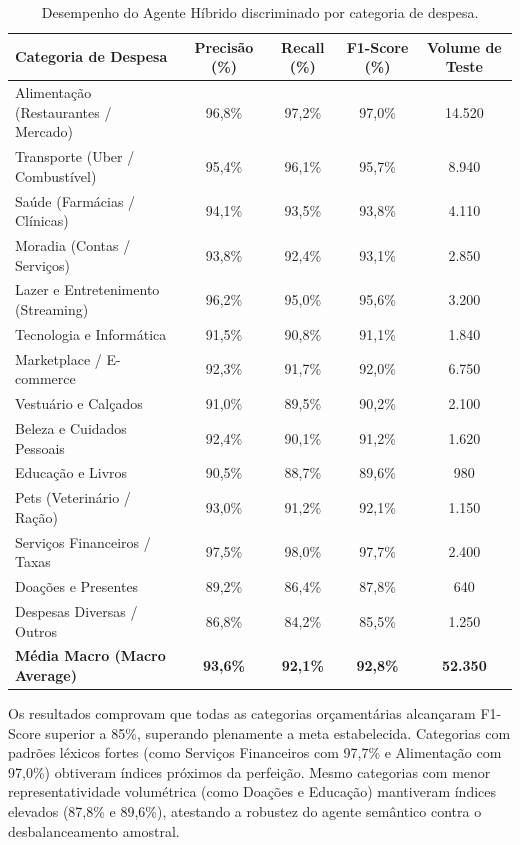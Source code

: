 \documentclass[
	12pt,				
	openright,			
	oneside,			
	a4paper,			
	english,			
	brazil				
	]{abntex2}
\begin{document}
\begin{table}[htb]
    \centering
    \caption{Desempenho do Agente Híbrido discriminado por categoria de despesa.}
    \label{tab:resultados_categorias}
    \begin{tabular}{lcccc}
        \toprule
        \textbf{Categoria de Despesa} & \textbf{Precisão (\%)} & \textbf{Recall (\%)} & \textbf{F1-Score (\%)} & \textbf{Volume de Teste} \\
        \midrule
        Alimentação (Restaurantes / Mercado) & 96,8\% & 97,2\% & 97,0\% & 14.520 \\
        Transporte (Uber / Combustível) & 95,4\% & 96,1\% & 95,7\% & 8.940 \\
        Saúde (Farmácias / Clínicas) & 94,1\% & 93,5\% & 93,8\% & 4.110 \\
        Moradia (Contas / Serviços) & 93,8\% & 92,4\% & 93,1\% & 2.850 \\
        Lazer e Entretenimento (Streaming) & 96,2\% & 95,0\% & 95,6\% & 3.200 \\
        Tecnologia e Informática & 91,5\% & 90,8\% & 91,1\% & 1.840 \\
        Marketplace / E-commerce & 92,3\% & 91,7\% & 92,0\% & 6.750 \\
        Vestuário e Calçados & 91,0\% & 89,5\% & 90,2\% & 2.100 \\
        Beleza e Cuidados Pessoais & 92,4\% & 90,1\% & 91,2\% & 1.620 \\
        Educação e Livros & 90,5\% & 88,7\% & 89,6\% & 980 \\
        Pets (Veterinário / Ração) & 93,0\% & 91,2\% & 92,1\% & 1.150 \\
        Serviços Financeiros / Taxas & 97,5\% & 98,0\% & 97,7\% & 2.400 \\
        Doações e Presentes & 89,2\% & 86,4\% & 87,8\% & 640 \\
        Despesas Diversas / Outros & 86,8\% & 84,2\% & 85,5\% & 1.250 \\
        \midrule
        \textbf{Média Macro (Macro Average)} & \textbf{93,6\%} & \textbf{92,1\%} & \textbf{92,8\%} & \textbf{52.350} \\
        \bottomrule
    \end{tabular}
\end{table}

Os resultados comprovam que todas as categorias orçamentárias alcançaram F1-Score superior a 85\%, superando plenamente a meta estabelecida. Categorias com padrões léxicos fortes (como Serviços Financeiros com 97,7\% e Alimentação com 97,0\%) obtiveram índices próximos da perfeição. Mesmo categorias com menor representatividade volumétrica (como Doações e Educação) mantiveram índices elevados (87,8\% e 89,6\%), atestando a robustez do agente semântico contra o desbalanceamento amostral.
\end{document}
